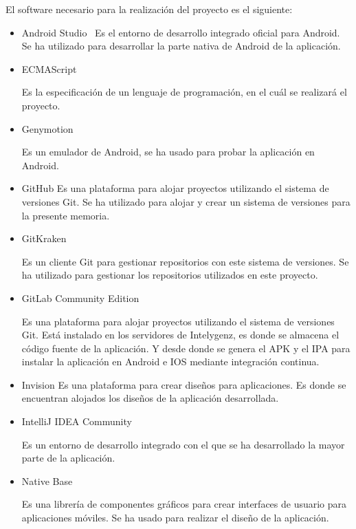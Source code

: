  El software necesario para la realización del proyecto es el siguiente:
\begin{itemize}
	\item Android Studio~\cite{ASTUDIO}
	Es el entorno de desarrollo integrado oficial para Android. Se ha utilizado para desarrollar la parte nativa 
	de Android de la aplicación.
	
	\item ECMAScript~\cite{ECMA}~\cite{ECMABOOK}
	
	Es la especificación de un lenguaje de programación, en el cuál se realizará el proyecto.
	
	\item Genymotion
	
	Es un emulador de Android, se ha usado para probar la aplicación en Android.
	
	\item GitHub
	Es una plataforma para alojar proyectos utilizando el sistema de versiones Git. Se ha utilizado para alojar 
	y crear un sistema de versiones para la presente memoria.
	
	\item GitKraken
	
	Es un cliente Git para gestionar repositorios con este sistema de versiones. Se ha utilizado para gestionar los 
	repositorios utilizados en este proyecto.
	
	\item GitLab Community Edition
	
	Es una plataforma para alojar proyectos utilizando el sistema de versiones Git. Está instalado en los servidores de 
	Intelygenz, es donde se almacena el código fuente de la aplicación. Y desde donde se genera el APK y el IPA para 
	instalar la aplicación en Android e IOS mediante integración continua.
	
	\item Invision
	Es una plataforma para crear diseños para aplicaciones. Es donde se encuentran alojados los diseños de la 
	aplicación desarrollada.
	
	\item IntelliJ IDEA Community~\cite{IDEA}
	
	Es un entorno de desarrollo integrado con el que se ha desarrollado la mayor parte de la aplicación.
	
	\item Native Base~\cite{NABA}
	
	Es una librería de componentes gráficos para crear interfaces de usuario para aplicaciones móviles. Se ha usado
	para realizar el diseño de la aplicación.
	

\end{itemize}
